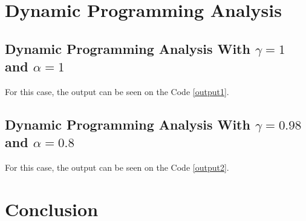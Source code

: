 \documentclass[journal,10pt,onecolumn,draftclsnofoot,]{IEEEtran}
\begin{document}






\section{Dynamic Programming Analysis}

\subsection{Dynamic Programming Analysis With $\gamma = 1$ and $\alpha = 1$}

For this case, the output can be seen on the Code \ref{output1}.



\subsection{Dynamic Programming Analysis With $\gamma = 0.98$ and $\alpha = 0.8$}

For this case, the output can be seen on the Code \ref{output2}.



\section {Conclusion}
\end{document}
